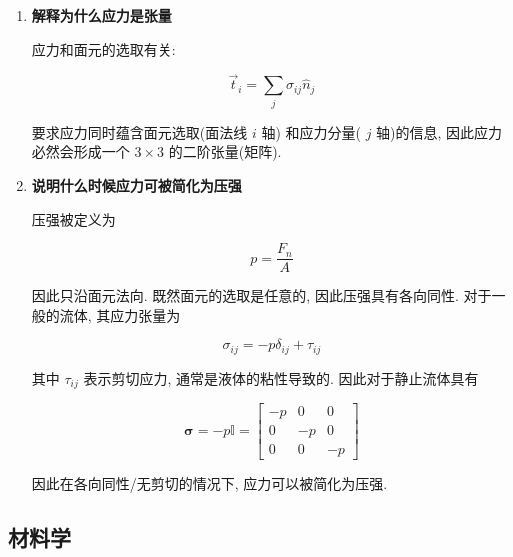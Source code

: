 \documentclass[../../main.tex]{subfiles}
\begin{document}
\begin{enumerate}
因为物体内部需要满足力矩平衡, 因此这是一个对称矩阵, 即满足

$$
\sigma_{ij} = \sigma_{ji}
$$

    \item \textbf{解释为什么应力是张量}
    
应力和面元的选取有关: 

$$
\vec{t}_{i} = \sum_{j}\sigma_{ij}\hat{n}_{j}
$$

要求应力同时蕴含面元选取(面法线 $i$ 轴) 和应力分量( $j$ 轴)的信息, 因此应力必然会形成一个 $3\times 3$ 的二阶张量(矩阵). 


    \item \textbf{说明什么时候应力可被简化为压强}

    压强被定义为

$$
p = \frac{F_{n}}{A}
$$

因此只沿面元法向. 既然面元的选取是任意的, 因此压强具有各向同性. 对于一般的流体, 其应力张量为

$$
\sigma_{ij} = -p\delta_{ij} + \tau_{ij}
$$

其中 $\tau_{ij}$ 表示剪切应力, 通常是液体的粘性导致的. 因此对于静止流体具有

$$
\mathbf{\sigma} = -p\mathbb{I} = \begin{bmatrix}
-p & 0 & 0\\
0 & -p & 0\\
0 & 0 & -p
\end{bmatrix}
$$

因此在各向同性/无剪切的情况下, 应力可以被简化为压强. 
\end{enumerate}

\subsection{材料学}
\end{document}
